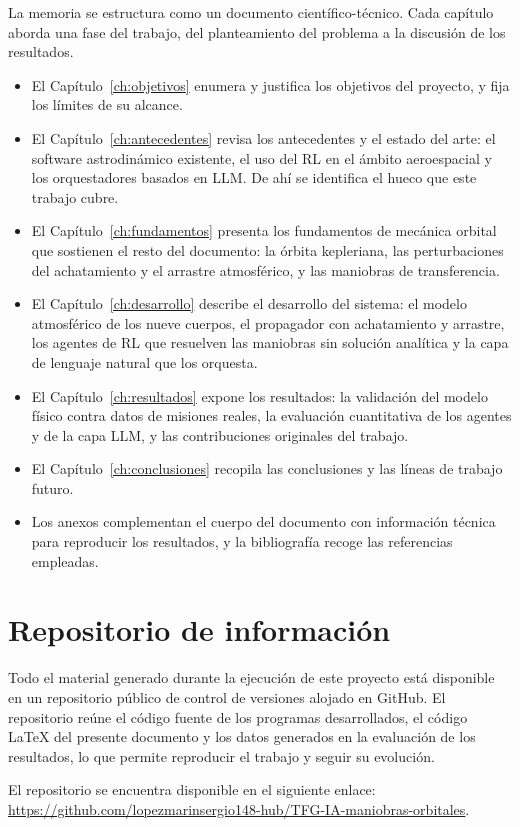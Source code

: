 La memoria se estructura como un documento científico-técnico. Cada capítulo aborda una fase del trabajo, del planteamiento del problema a la discusión de los resultados.

\begin{itemize}
  \item El Capítulo~\ref{ch:objetivos} enumera y justifica los objetivos del proyecto, y fija los límites de su alcance.
  \item El Capítulo~\ref{ch:antecedentes} revisa los antecedentes y el estado del arte: el software astrodinámico existente, el uso del \gls{RL} en el ámbito aeroespacial y los orquestadores basados en \gls{LLM}. De ahí se identifica el hueco que este trabajo cubre.
  \item El Capítulo~\ref{ch:fundamentos} presenta los fundamentos de mecánica orbital que sostienen el resto del documento: la órbita kepleriana, las perturbaciones del achatamiento y el arrastre atmosférico, y las maniobras de transferencia.
  \item El Capítulo~\ref{ch:desarrollo} describe el desarrollo del sistema: el modelo atmosférico de los nueve cuerpos, el propagador con achatamiento y arrastre, los agentes de \gls{RL} que resuelven las maniobras sin solución analítica y la capa de lenguaje natural que los orquesta.
  \item El Capítulo~\ref{ch:resultados} expone los resultados: la validación del modelo físico contra datos de misiones reales, la evaluación cuantitativa de los agentes y de la capa \gls{LLM}, y las contribuciones originales del trabajo.
  \item El Capítulo~\ref{ch:conclusiones} recopila las conclusiones y las líneas de trabajo futuro.
  \item Los anexos complementan el cuerpo del documento con información técnica para reproducir los resultados, y la bibliografía recoge las referencias empleadas.
\end{itemize}

\section{Repositorio de información}
\label{sec:intro-repositorio}

Todo el material generado durante la ejecución de este proyecto está disponible en un repositorio público de control de versiones alojado en GitHub. El repositorio reúne el código fuente de los programas desarrollados, el código \LaTeX{} del presente documento y los datos generados en la evaluación de los resultados, lo que permite reproducir el trabajo y seguir su evolución.

El repositorio se encuentra disponible en el siguiente enlace: \url{https://github.com/lopezmarinsergio148-hub/TFG-IA-maniobras-orbitales}.